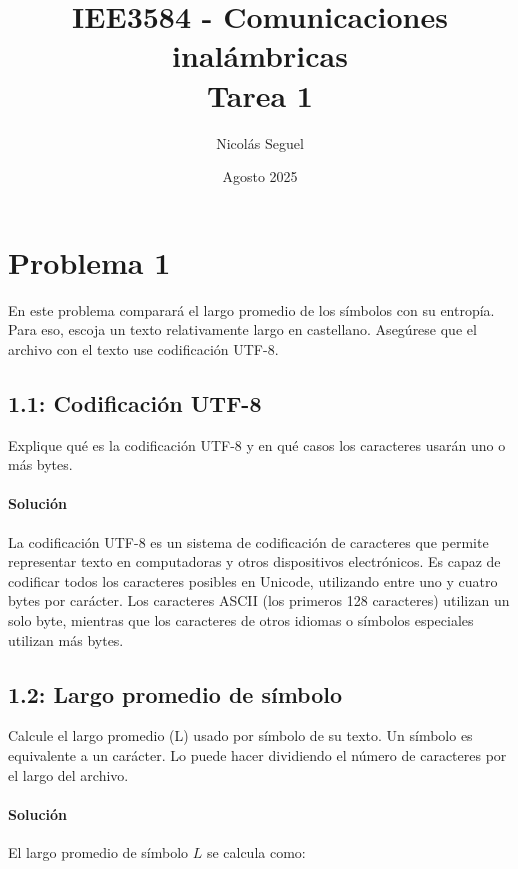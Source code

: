 \documentclass[11pt]{article}
\title{IEE3584 - Comunicaciones inalámbricas \\
Tarea 1}
\author{Nicolás Seguel}
\date{Agosto 2025}
\begin{document}

\maketitle

\section*{Problema 1}

En este problema comparará el largo promedio de los símbolos con su entropía. Para eso, escoja un texto relativamente largo en castellano. Asegúrese que el archivo con el texto use codificación UTF-8.

\subsection*{1.1: Codificación UTF-8}

Explique qué es la codificación UTF-8 y en qué casos los caracteres usarán uno o más bytes.

\paragraph{Solución}

La codificación UTF-8 es un sistema de codificación de caracteres que permite representar texto en computadoras y otros dispositivos electrónicos. Es capaz de codificar todos los caracteres posibles en Unicode, utilizando entre uno y cuatro bytes por carácter. Los caracteres ASCII (los primeros 128 caracteres) utilizan un solo byte, mientras que los caracteres de otros idiomas o símbolos especiales utilizan más bytes.

\subsection*{1.2: Largo promedio de símbolo}

Calcule el largo promedio (L) usado por símbolo de su texto. Un símbolo es equivalente a un carácter. Lo puede hacer dividiendo el número de caracteres por el largo del archivo.

\paragraph{Solución}

El largo promedio de símbolo \( L \) se calcula como:
\end{document}
